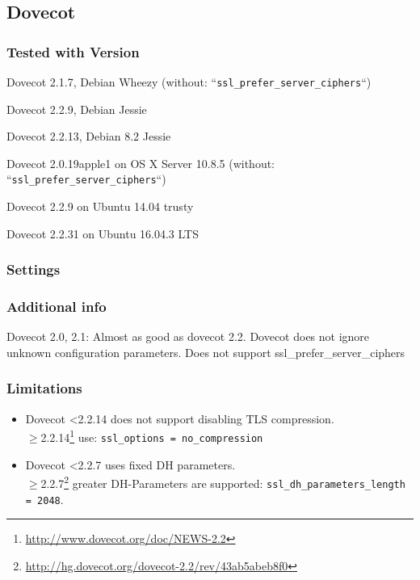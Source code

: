 \subsection{Dovecot}


\subsubsection{Tested with Version}
\begin{itemize*}
  \item Dovecot 2.1.7, Debian Wheezy (without: ``\texttt{ssl\_prefer\_server\_ciphers}``)
  \item Dovecot 2.2.9, Debian Jessie
  \item Dovecot 2.2.13, Debian 8.2 Jessie
  \item Dovecot 2.0.19apple1 on OS X Server 10.8.5 (without: ``\texttt{ssl\_prefer\_server\_ciphers}``)
  \item Dovecot 2.2.9 on Ubuntu 14.04 trusty
  \item Dovecot 2.2.31 on Ubuntu 16.04.3 LTS
\end{itemize*}

\subsubsection{Settings}


\subsubsection{Additional info}
Dovecot 2.0, 2.1: Almost as good as dovecot 2.2. Dovecot does not ignore unknown configuration parameters. Does not support
ssl\_prefer\_server\_ciphers

\subsubsection{Limitations}
\begin{itemize}
	\item Dovecot <2.2.14 does not support disabling TLS compression.\\ 
		{\(\geq\)2.2.14}\footnote{\url{http://www.dovecot.org/doc/NEWS-2.2}} 
		use: \texttt{ssl\_options = no\_compression}
	\item Dovecot <2.2.7 uses fixed DH parameters.\\
		{\(\geq\)2.2.7}\footnote{\url{http://hg.dovecot.org/dovecot-2.2/rev/43ab5abeb8f0}} 
		greater DH-Parameters are supported: \texttt{ssl\_dh\_parameters\_length = 2048}. 
\end{itemize}

